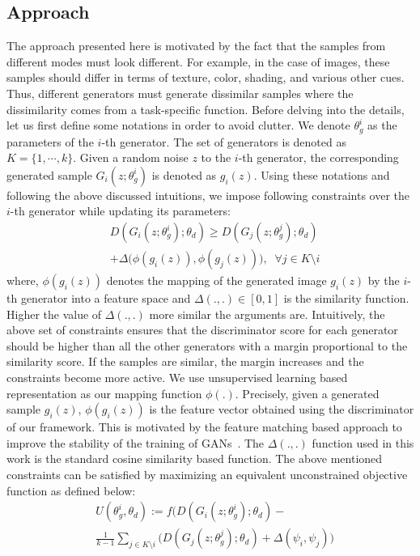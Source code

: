 \subsection{Approach}
The approach presented here is motivated by the fact that the samples from different modes must look different. For example, in the case of images, these samples should differ in terms of texture, color, shading, and various other cues. Thus, different generators must generate dissimilar samples where the dissimilarity comes from a task-specific function. Before delving into the details, let us first define some notations in order to avoid clutter. We denote $\theta_g^i$ as the parameters of the $i$-th generator. The set of generators is denoted as $K = \{1, \cdots, k\}$. Given a random noise $z$ to the $i$-th generator, the corresponding generated sample $G_i(z; \theta_g^i)$ is denoted as $g_i(z)$. Using these notations and following the above discussed intuitions, we impose following constraints over the $i$-th generator while updating its parameters:
\begin{align}
	\label{eq:divConstraint}
	&D( G_i( z; \theta_g^i ); \theta_d ) \geq D ( G_j (z; \theta_g^j ) ; \theta_d) \nonumber \\
	&+ \Delta\big( \phi(g_i(z)), \phi(g_j(z)) \big), \; \; \forall j \in K \setminus i
\end{align}
where, $\phi(g_i(z))$ denotes the mapping of the generated image $g_i(z)$ by the $i$-th generator into a feature space and $\Delta(.,.) \in [0,1]$ is the similarity function. Higher the value of $\Delta(.,.)$ more similar the arguments are. Intuitively, the above set of constraints ensures that the discriminator score for each generator should be higher than all the other generators with a margin proportional to the similarity score. If the samples are similar, the margin increases and the constraints become more active. We use unsupervised learning based representation as our mapping function $\phi(.)$. Precisely, given a generated sample $g_i(z)$, $\phi(g_i(z))$ is the feature vector obtained using the discriminator of our framework. This is motivated by the feature matching based approach to improve the stability of the training of GANs~\cite{salimans2016improved}. The $\Delta(.,.)$ function used in this work is the standard cosine similarity based function. The above mentioned constraints can be satisfied by maximizing an equivalent unconstrained objective function as defined below:
\begin{align*}
	&U(\theta_g^i, \theta_d) := f\Big( D( G_i( z; \theta_g^i ); \theta_d ) - \nonumber \\
	&\frac{1}{k-1} \sum_{j \in K \setminus i} \big( D( G_j (z; \theta_g^j ) ; \theta_d) + \Delta( \psi_i, \psi_j) \Big) 
\end{align*}
